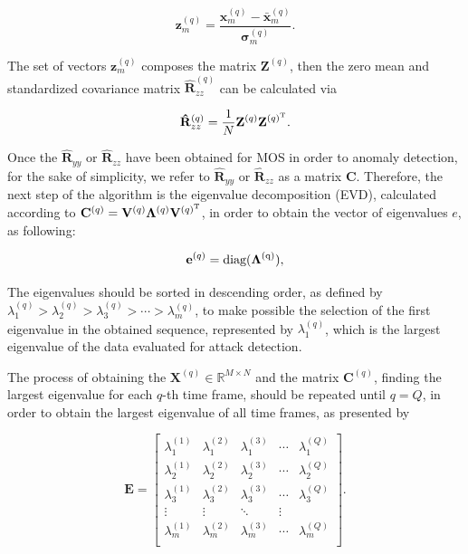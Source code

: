 \documentclass[twocolumn]{svjour3}          	%
\begin{document}
\begin{equation}\label{eq:eq05}
\mathbf{z}_{m}^{(q)} = \frac{\mathbf{x}_{m}^{(q)} - \bar{\mathbf{x}}_{m}^{(q)}}{\mathbf{\sigma}_{m}^{(q)}}.
\end{equation}

The set of vectors $\mathbf{z}_{m}^{(q)}$ composes the matrix $\mathbf{Z}^{(q)}$, then the zero mean and standardized covariance matrix $\mathbf{\hat{R}}_{zz}^{(q)}$ can be calculated via 

\begin{equation}\label{eq:eq06}
\mathbf{\hat{R}}_{zz}^{(q)} = \frac{1}{N}\mathbf{Z}^{(q)}\mathbf{Z}^{(q)^{\rm T}}.
\end{equation}

Once the $\mathbf{\hat{R}}_{yy}$ or $\mathbf{\hat{R}}_{zz}$ have been obtained for MOS in order to anomaly detection, for the sake of simplicity, we refer to $\mathbf{\hat{R}}_{yy}$ or $\mathbf{\hat{R}}_{zz}$ as a matrix $\mathbf{C}$. Therefore, the next step of the algorithm is the eigenvalue decomposition (EVD), calculated according to $\mathbf{C}^{(q)} = \mathbf{V}^{(q)}\mathbf{\Lambda}^{(q)}\mathbf{V}^{(q)^{\rm T}}$, in order to obtain the vector of eigenvalues $e$, as following:

\begin{equation}\label{eq:eq07}
\mathbf{e}^{(q)} = \rm diag(\mathbf{\Lambda}^{(q)}),
\end{equation}

The eigenvalues should be sorted in descending order, as defined by $\lambda_{1}^{(q)} > \lambda_{2}^{(q)} > \lambda_{3}^{(q)} > \cdots > \lambda_{m}^{(q)}$, to make possible the selection of the first eigenvalue in the obtained sequence, represented by $\lambda_{1}^{(q)}$, which is the largest eigenvalue of the data evaluated for attack detection.

The process of obtaining the $\mathbf{X}^{(q)} \in \mathbb{R}^{M\times{N}}$ and the matrix $\mathbf{C}^{(q)}$, finding the largest eigenvalue for each $q$-th time frame, should be repeated until $q = Q$, in order to obtain the largest eigenvalue of all time frames, as presented by 

\begin{equation}\label{eq:eq08}
\mathbf{E} =
\begin{bmatrix}
  \lambda_1^{(1)} & \lambda_1^{(2)} & \lambda_1^{(3)} & \cdots & \lambda_1^{(Q)} \\
  \lambda_2^{(1)} & \lambda_2^{(2)} & \lambda_2^{(3)} & \cdots & \lambda_2^{(Q)} \\
  \lambda_3^{(1)} & \lambda_3^{(2)} & \lambda_3^{(3)} & \cdots & \lambda_3^{(Q)} \\
  \vdots & \vdots & \ddots & \vdots  \\
  \lambda_m^{(1)} & \lambda_m^{(2)} & \lambda_m^{(3)} & \cdots & \lambda_m^{(Q)} \\
\end{bmatrix}.
\end{equation}
\end{document}
